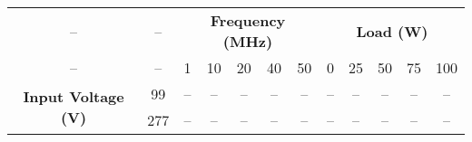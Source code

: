 \begin{tabular}{cccccccccccc}
-- & -- & \multicolumn{5}{c}{\textbf{Frequency (MHz)}} & \multicolumn{5}{c}{\textbf{Load (W)}} \\
-- & -- & 1 & 10 & 20 & 40 & 50 & 0 & 25 & 50 & 75 & 100 \\
\midrule
\multirow{2}{*}{\textbf{Input Voltage (V)}} & 99 & -- & -- & -- & -- & -- & -- & -- & -- & -- & -- \\
 & 277 & -- & -- & -- & -- & -- & -- & -- & -- & -- & -- \\
\end{tabular}